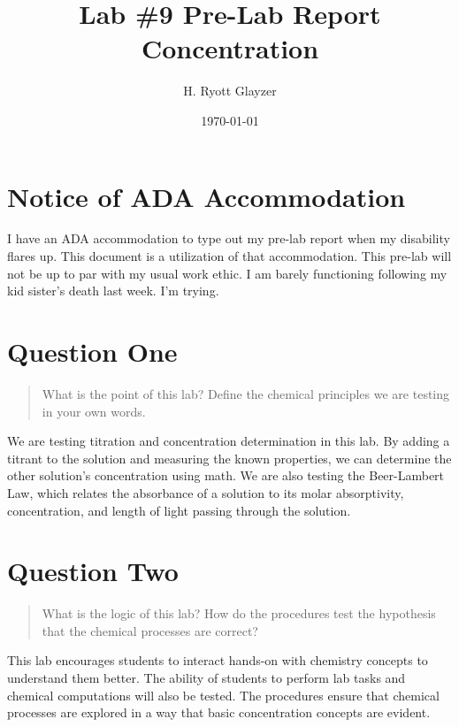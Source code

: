 \documentclass[11pt, letterpaper]{article}
\begin{document}


\title{Lab \#9 Pre-Lab Report \\ \large Concentration}
\author{H. Ryott Glayzer}
\date{\today}


\maketitle


\section*{Notice of ADA Accommodation}
I have an ADA accommodation to type out my pre-lab report when my disability flares up.
This document is a utilization of that accommodation.
This pre-lab will not be up to par with my usual work ethic.
I am barely functioning following my kid sister's death last week.
I'm trying.

\section{Question One}
\begin{quote}
    What is the point of this lab? Define the chemical principles we are testing in your own words.
\end{quote}
We are testing titration and concentration determination in this lab.
By adding a titrant to the solution and measuring the known properties,
we can determine the other solution's concentration using math.
We are also testing the Beer-Lambert Law, which relates the absorbance of a 
solution to its molar absorptivity, concentration, and length of light passing through 
the solution.

\section{Question Two}
\begin{quote}
    What is the logic of this lab? How do the procedures test the hypothesis that the chemical 
    processes are correct?
\end{quote}
This lab encourages students to interact hands-on with chemistry concepts to 
understand them better.
The ability of students to perform lab tasks and chemical computations will
also be tested.
The procedures ensure that chemical processes are explored in a way that
basic concentration concepts are evident.
\end{document}
